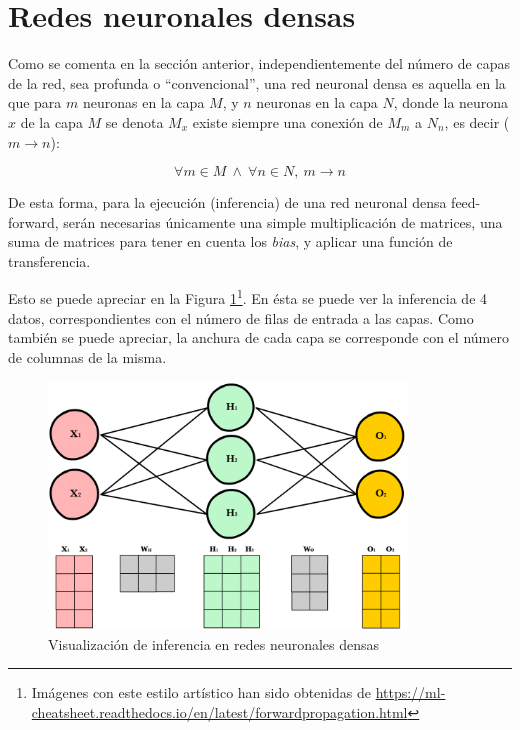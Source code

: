 \section{Redes neuronales densas}
\label{sec:redes_reuronales_densas}
Como se comenta en la sección anterior, independientemente del número de capas de la red, sea profunda o ``convencional'', una red neuronal densa es aquella en la que para $m$ neuronas en la capa $M$, y $n$ neuronas en la capa $N$, donde la neurona $x$ de la capa $M$ se denota $M_{x}$ existe siempre una conexión de $M_{m}$ a $N_{n}$, es decir ($m\longrightarrow n$):

\begin{equation}
\forall m \in M \:\wedge\: \forall n \in N, \: m\longrightarrow n\nonumber
\label{eq:dense_nn}
\end{equation}

De esta forma, para la ejecución (inferencia) de una red neuronal densa feed-forward, serán necesarias únicamente una simple multiplicación de matrices, una suma de matrices para tener en cuenta los \textit{bias}, y aplicar una función de transferencia.

Esto se puede apreciar en la Figura \ref{fig:nn_matrix_dense}\footnote{Imágenes con este estilo artístico han sido obtenidas de \url{https://ml-cheatsheet.readthedocs.io/en/latest/forwardpropagation.html}}. En ésta se puede ver la inferencia de 4 datos, correspondientes con el número de filas de entrada a las capas. Como también se puede apreciar, la anchura de cada capa se corresponde con el número de columnas de la misma. 

\begin{figure}[h!]
    \centering
    \includegraphics[width=0.85\textwidth]{img/neural_network_matrix_dense.png}
    \caption{Visualización de inferencia en redes neuronales densas}
    \label{fig:nn_matrix_dense}
\end{figure}

